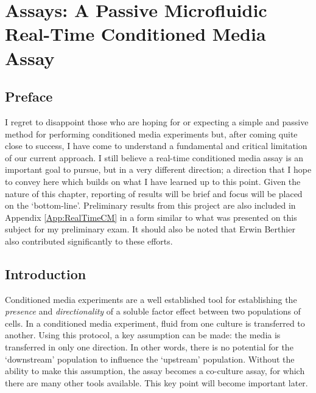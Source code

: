 \chapter{Assays: A Passive Microfluidic Real-Time Conditioned Media Assay}
\label{Chap:RealTimeCM}

\section{Preface}
I regret to disappoint those who are hoping for or expecting a simple and passive method for performing conditioned media experiments but, after coming quite close to success, I have come to understand a fundamental and critical limitation of our current approach. I still believe a real-time conditioned media assay is an important goal to pursue, but in a very different direction; a direction that I hope to convey here which builds on what I have learned up to this point. Given the nature of this chapter, reporting of results will be brief and focus will be placed on the `bottom-line'. Preliminary results from this project are also included in Appendix \ref{App:RealTimeCM} in a form similar to what was presented on this subject for my preliminary exam. It should also be noted that Erwin Berthier also contributed significantly to these efforts.

\section{Introduction}
Conditioned media experiments are a well established tool for establishing the \emph{presence} and \emph{directionality} of a soluble factor effect between two populations of cells. In a conditioned media experiment, fluid from one culture is transferred to another. Using this protocol, a key assumption can be made: the media is transferred in only one direction. In other words, there is no potential for the `downstream' population to influence the `upstream' population. Without the ability to make this assumption, the assay becomes a co-culture assay, for which there are many other tools available. This key point will become important later.

